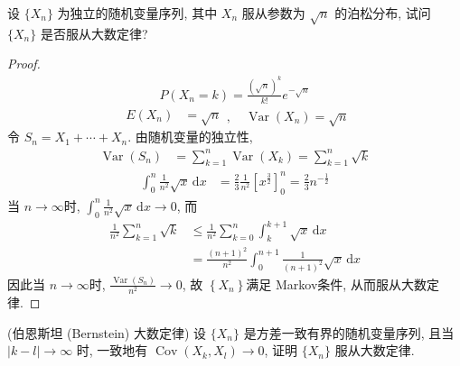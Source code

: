 \documentclass[../main.tex]{subfiles}
\begin{document}
\begin{exercise}{}{}
设 $\{X_n\}$ 为独立的随机变量序列, 其中 $X_n$ 服从参数为 $\sqrt{n}$ 的泊松分布, 试问 $\{X_n\}$ 是否服从大数定律?
\end{exercise}
\begin{proof}
  $$ \begin{aligned} P\left(X_{n}= k\right)= \frac{\left(\sqrt{n}\right)^{k} }{ k!}e^{-\sqrt{n}} \end{aligned} $$ 
 $$ \begin{aligned} E\left(X_{n}\right)&= \sqrt{n} \end{aligned} ,\quad \operatorname{Var}\left(X_{n}\right)=\sqrt{n} $$ 
令 $S_{n}= X_1+ \cdots + X_{n}$. 由随机变量的独立性, 
 $$ \begin{aligned} \operatorname{Var}\left(S_{n}\right)&= \sum _{k= 1}^{n}\operatorname{Var}\left(X_{k}\right)= \sum _{k= 1}^{n}\sqrt{k} \end{aligned} $$ 
  $$ \begin{aligned} \int_{0}^{n}\frac{1 }{n^{2} }\sqrt{x}\,\mathrm{d} x&= \frac{2}{3} \frac{1 }{n^{2} }\left[ x^{\frac{3}{2}} \right]_{0}^{n}=\frac{2}{3}n^{-\frac{1}{2}} \end{aligned} $$ 
当 $n\to \infty$时, $\int_{0}^{n}\frac{1 }{n ^{2}}\sqrt{x}\,\mathrm{d} x\to 0$, 而
 $$ \begin{aligned} \frac{1 }{n^{2} }\sum _{k= 1}^{n}\sqrt{k}&\le \frac{1 }{n^{2} }\sum _{k= 0}^{n}\int_{k}^{k+  1}\sqrt{x}\,\mathrm{d} x\\&= \frac{\left(n+ 1\right)^{2}}{n^{2} }\int_{0}^{n+ 1}\frac{1 }{\left(n+ 1\right)^{2}}\sqrt{x}\,\mathrm{d} x \end{aligned} $$ 
因此当 $n\to \infty$时, $\frac{\operatorname{Var}\left(S_{n}\right) }{n^{2} }\to 0$, 故 $\left\{ X_{n} \right\}$满足 Markov条件, 从而服从大数定律.
\end{proof}
\begin{exercise}{(伯恩斯坦 (Bernstein) 大数定律)}{}
设 $\{X_n\}$ 是方差一致有界的随机变量序列, 且当 $|k-l| \to \infty$ 时, 一致地有 $\operatorname{Cov}(X_k, X_l) \to 0$, 证明 $\{X_n\}$ 服从大数定律.
\end{exercise}
\end{document}
